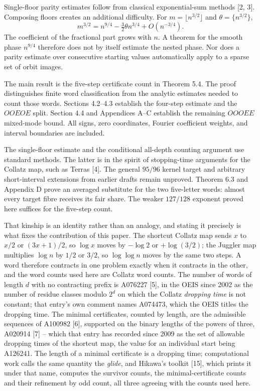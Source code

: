 \documentclass[11pt,a4paper]{article}
\begin{document}
Single-floor parity estimates follow from classical exponential-sum
methods {[}2, 3{]}. Composing floors creates an additional difficulty.
For \(m=\lfloor n^{3/2}\rfloor\) and \(\theta=\{n^{3/2}\}\), \[
m^{3/2}=n^{9/4}-\tfrac32\theta n^{3/4}+O(n^{-3/4}).
\] The coefficient of the fractional part grows with \(n\). A theorem
for the smooth phase \(n^{9/4}\) therefore does not by itself estimate
the nested phase. Nor does a parity estimate over consecutive starting
values automatically apply to a sparse set of orbit images.

The main result is the five-step certificate count in Theorem 5.4. The
proof distinguishes finite word classification from the analytic
estimates needed to count those words. Sections 4.2--4.3 establish the
four-step estimate and the \(OOEOE\) split. Section 4.4 and Appendices
A--C establish the remaining \(OOOEE\) mixed-mode bound. All signs, zero
coordinates, Fourier coefficient weights, and interval boundaries are
included.

The single-floor estimate and the conditional all-depth counting
argument use standard methods. The latter is in the spirit of
stopping-time arguments for the Collatz map, such as Terras {[}4{]}. The
general \(95/96\) kernel target and arbitrary short-interval extensions
from earlier drafts remain unproved. Theorem 6.3 and Appendix D prove an
averaged substitute for the two five-letter words: almost every target
fibre receives its fair share. The weaker \(127/128\) exponent proved
here suffices for the five-step count.

That kinship is an identity rather than an analogy, and stating it
precisely is what fixes the contribution of this paper. The shortcut
Collatz map sends \(x\) to \(x/2\) or \((3x+1)/2\), so \(\log x\) moves
by \(-\log2\) or \(+\log(3/2)\); the Juggler map multiplies \(\log n\)
by \(1/2\) or \(3/2\), so \(\log\log n\) moves by the same two steps. A
word therefore contracts in one problem exactly when it contracts in the
other, and the word counts used here are Collatz word counts. The number
of words of length \(d\) with no contracting prefix is A076227 {[}5{]},
in the OEIS since 2002 as the number of residue classes modulo \(2^d\)
on which the Collatz \emph{dropping time} is not constant; that entry's
own comment names A074473, which the OEIS titles the dropping time. The
minimal certificates, counted by length, are the admissible sequences of
A100982 {[}6{]}, supported on the binary lengths of the powers of three,
A020914 {[}7{]} -- which that entry has recorded since 2009 as the set
of allowable dropping times of the shortcut map, the value for an
individual start being A126241. The length of a minimal certificate is a
dropping time; computational work calls the same quantity the
\emph{glide}, and Hikawa's toolkit {[}15{]}, which prints it under that
name, computes the survivor counts, the minimal-certificate counts and
their refinement by odd count, all three agreeing with the counts used
here.
\end{document}
